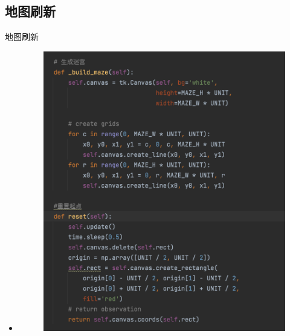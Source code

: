 \documentclass{beamer}
\begin{document}
\subsection{地图刷新 }
\begin{frame}{地图刷新}
    \begin{itemize}
    \tiny
    \item 
    
        \begin{minipage}{1\linewidth}
        \medskip
        \begin{figure}[h]
            \centering
            \includegraphics[height=.8\textheight]{pic/14.png}
        \end{figure}
    \end{minipage}
    
    \end{itemize}
    
\end{frame}
\end{document}
